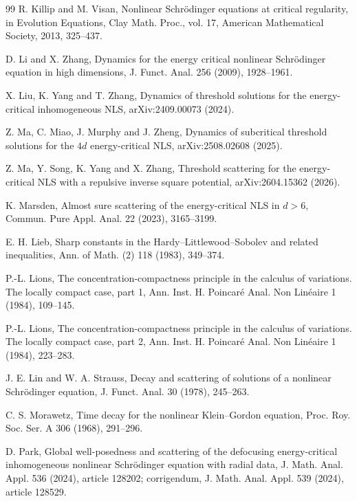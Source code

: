 \documentclass{interact}
\numberwithin{equation}{section}
\theoremstyle{plain}
\theoremstyle{definition}
\theoremstyle{remark}
\begin{document}
\begin{thebibliography}{99}
R. Killip and M. Visan, Nonlinear Schr\"odinger equations at critical regularity, in Evolution Equations, Clay Math. Proc., vol. 17, American Mathematical Society, 2013, 325--437.

D. Li and X. Zhang, Dynamics for the energy critical nonlinear Schr\"odinger equation in high dimensions, J. Funct. Anal. 256 (2009), 1928--1961.

X. Liu, K. Yang and T. Zhang, Dynamics of threshold solutions for the energy-critical inhomogeneous NLS, arXiv:2409.00073 (2024).

Z. Ma, C. Miao, J. Murphy and J. Zheng, Dynamics of subcritical threshold solutions for the $4d$ energy-critical NLS, arXiv:2508.02608 (2025).

Z. Ma, Y. Song, K. Yang and X. Zhang, Threshold scattering for the energy-critical NLS with a repulsive inverse square potential, arXiv:2604.15362 (2026).

K. Marsden, Almost sure scattering of the energy-critical NLS in $d>6$, Commun. Pure Appl. Anal. 22 (2023), 3165--3199.

E. H. Lieb, Sharp constants in the Hardy--Littlewood--Sobolev and related inequalities, Ann. of Math. (2) 118 (1983), 349--374.

P.-L. Lions, The concentration-compactness principle in the calculus of variations. The locally compact case, part 1, Ann. Inst. H. Poincar\'e Anal. Non Lin\'eaire 1 (1984), 109--145.

P.-L. Lions, The concentration-compactness principle in the calculus of variations. The locally compact case, part 2, Ann. Inst. H. Poincar\'e Anal. Non Lin\'eaire 1 (1984), 223--283.

J. E. Lin and W. A. Strauss, Decay and scattering of solutions of a nonlinear Schr\"odinger equation, J. Funct. Anal. 30 (1978), 245--263.

C. S. Morawetz, Time decay for the nonlinear Klein--Gordon equation, Proc. Roy. Soc. Ser. A 306 (1968), 291--296.

D. Park, Global well-posedness and scattering of the defocusing energy-critical inhomogeneous nonlinear Schr\"odinger equation with radial data, J. Math. Anal. Appl. 536 (2024), article 128202; corrigendum, J. Math. Anal. Appl. 539 (2024), article 128529.


\end{thebibliography}
\end{document}
